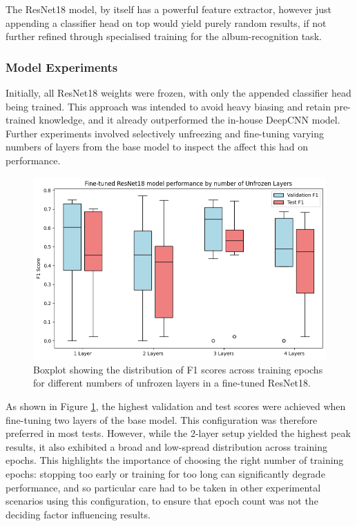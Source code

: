                The ResNet18 model, by itself has a powerful feature extractor, however just appending a classifier head on top would yield purely random results, if not further refined through specialised training for the album-recognition task.
    
                \subsubsection{Model Experiments}
    
                    Initially, all ResNet18 weights were frozen, with only the appended classifier head being trained. This approach was intended to avoid heavy biasing and retain pre-trained knowledge, and it already outperformed the in-house DeepCNN model. Further experiments involved selectively unfreezing and fine-tuning varying numbers of layers from the base model to inspect the affect this had on performance.
    
                    \begin{figure}
                        \centering
                        \includegraphics[width=\textwidth]{images/ResNetLayerTests.png}
                        \caption{Boxplot showing the distribution of F1 scores across training epochs for different numbers of unfrozen layers in a fine-tuned ResNet18.} \label{fig:ResNetLayers}
                    \end{figure}
                    
                    As shown in Figure \ref{fig:ResNetLayers}, the highest validation and test scores were achieved when fine-tuning two layers of the base model. This configuration was therefore preferred in most tests. However, while the 2-layer setup yielded the highest peak results, it also exhibited a broad and low-spread distribution across training epochs. This highlights the importance of choosing the right number of training epochs: stopping too early or training for too long can significantly degrade performance, and so particular care had to be taken in other experimental scenarios using this configuration, to ensure that epoch count was not the deciding factor influencing results.
        
